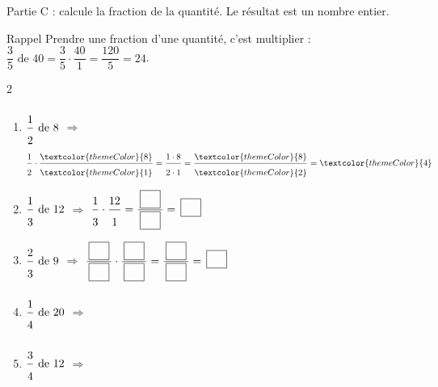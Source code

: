\vfill
\textcolor{themeColor}{Partie C} : calcule la fraction de la quantité. Le résultat est un nombre entier.

\begin{astuce}{Rappel}
\textcolor{themeColor}{Prendre une fraction d'une quantité}, c'est multiplier : $\dfrac{3}{5}\text{ de }40=\dfrac{3}{5} \cdot \dfrac{40}{1}=\dfrac{120}{5}=24$.
\end{astuce}

\begin{multicols}{2}
\begin{enumerate}[leftmargin=*,align=parleft, label=\alph*), itemsep=2pt, start=11]
\item $\FA{1}{2}\text{ de }8$ \quad $\Longrightarrow$ \quad $\FA{1}{2}\cdot\FA{\textcolor{themeColor}{8}}{\textcolor{themeColor}{1}}=\FA{1 \cdot 8}{2 \cdot 1}=\FA{\textcolor{themeColor}{8}}{\textcolor{themeColor}{2}}=\textcolor{themeColor}{4}$
\item $\FA{1}{3}\text{ de }12$ \quad $\Longrightarrow$ \quad $\FA{1}{3}\cdot\FA{12}{1}=\FA{\CaseC}{\CaseC}=\CaseC$
\item $\FA{2}{3}\text{ de }9$ \quad $\Longrightarrow$ \quad $\FA{\CaseC}{\CaseC}\cdot\FA{\CaseC}{\CaseC}=\FA{\CaseC}{\CaseC}=\CaseC$
\item $\FA{1}{4}\text{ de }20$ \quad $\Longrightarrow$
\item $\FA{3}{4}\text{ de }12$ \quad $\Longrightarrow$
\end{enumerate}
\end{multicols}

\newpage
{}

